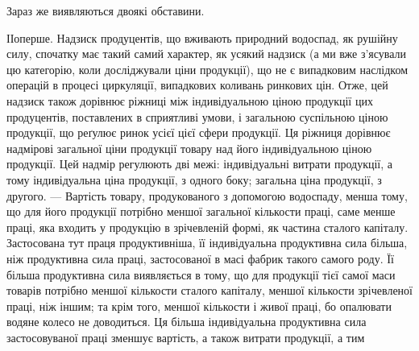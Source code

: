 Зараз же виявляються двоякі обставини.

ІІоперше. Надзиск продуцентів, що вживають природний водоспад, як
рушійну силу, спочатку має такий самий характер, як усякий надзиск (а ми
вже з’ясували цю категорію, коли досліджували ціни продукції), що не є
випадковим наслідком операцій в процесі циркуляції, випадкових коливань ринкових
цін. Отже, цей надзиск також дорівнює ріжниці між індивідуальною ціною продукції
цих продуцентів, поставлених в сприятливі умови, і загальною суспільною ціною
продукції, що реґулює ринок усієї цієї сфери продукції. Ця ріжниця дорівнює
надмірові загальної ціни продукції товару над його індивідуальною ціною продукції.
Цей надмір регулюють дві межі: індивідуальні витрати продукції, а тому
індивідуальна ціна продукції, з одного боку; загальна ціна продукції, з другого. —
Вартість товару, продукованого з допомогою водоспаду, менша тому, що для
його продукції потрібно меншої загальної кількости праці, саме менше праці, яка
входить у продукцію в зрічевленій формі, як частина сталого капіталу. Застосована
тут праця продуктивніша, її індивідуальна продуктивна сила більша,
ніж продуктивна сила праці, застосованої в масі фабрик такого самого роду.
Її більша продуктивна сила виявляється в тому, що для продукції тієї самої
маси товарів потрібно меншої кількости сталого капіталу, меншої кількости
зрічевленої праці, ніж іншим; та крім того, меншої кількости і живої праці,
бо опалювати водяне колесо не доводиться. Ця більша індивідуальна продуктивна
сила застосовуваної праці зменшує вартість, а також витрати продукції, а тим
\parbreak{}  %
